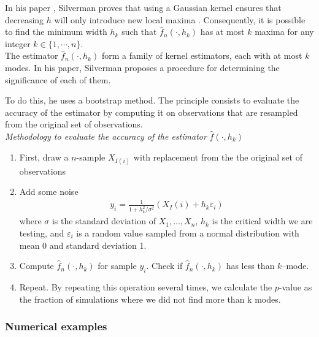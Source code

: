 In his paper , Silverman proves that using a Gaussian kernel ensures that decreasing $h$ will only introduce new local maxima \cite{silverman1981using}. Consequently, it is possible to find the minimum width $h_k$ such that $ \hat f_n(\cdot, h_k)$ has at most $k$ maxima for any integer $k \in \{1, \cdots, n\}$. \\

The estimator $\hat f_n(\cdot, h_k)$ form a family of kernel estimators, each with at most $k$ modes. In his paper, Silverman proposes a procedure for determining the significance of each of them. 

To do this, he uses a bootstrap method. The principle consists to evaluate the accuracy of the estimator by computing it on observations that are resampled from the original set of observations. \\

\textit{Methodology to evaluate the accuracy of the estimator} $\hat f(\cdot, h_k)$
\begin{enumerate}
    \item  First, draw a $n$-sample $X_{I(i)}$ with replacement from the the original set of observations
    \item Add some noise
    \begin{align*}
        y_i = \frac{1}{1+h_k^2/\sigma^2}(X_I(i) + h_k \varepsilon_i)
    \end{align*}
    where $\sigma$ is the standard deviation of $X_1, \ldots, X_n$, $h_k$ is the critical width we are testing, and $\varepsilon_i$ is a random value sampled from a normal distribution with mean 0 and standard deviation 1.
    \item Compute $\hat f_n(\cdot, h_k)$ for sample $y_i$. Check if $\hat f_n(\cdot, h_k)$ has less than $k$--mode. 
    \item Repeat. By repeating this operation several times, we calculate the $p$-value as the fraction of simulations where we did not find more than k modes.
\end{enumerate}


\subsubsection{Numerical examples}

